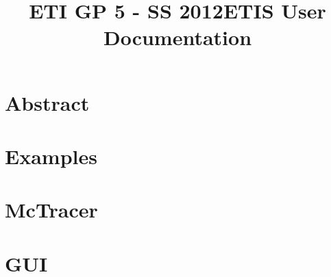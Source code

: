 \documentclass{scrartcl}
\title{ETI GP 5 - SS 2012\newline ETIS User Documentation}
\begin{document}
\maketitle
\tableofcontents
\newpage

\section{Abstract} 
\section{Examples} 
\section{McTracer} 
\section{GUI} 
\end{document}
